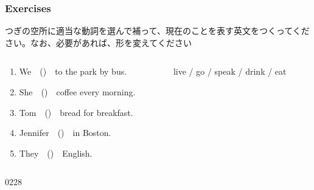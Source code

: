 \documentclass[aspectratio=169,xcolor={dvipsnames,table}]{beamer}
\newcommand{\myaudio}[1]{\href{#1}{\faVolumeUp}}
\begin{document}
\begin{frame}[plain,label=ex]\frametitle{Exercises}

{\small つぎの空所に適当な動詞を選んで補って、現在のことを表す英文をつくってください。なお、必要があれば、形を変えてください}

\bigskip

\begin{columns}
\begin{column}{.5\textwidth}
  \begin{enumerate}
   \item We~~()~~to the park by bus.
   \item  She~~()~~coffee every morning.
   \item Tom~~()~~bread for breakfast.
   \item Jennifer~~()~~in Boston.
   \item They~~()~~English.
  \end{enumerate}
\end{column}
\begin{column}{.45\textwidth}
\begin{tcolorbox}[title=この中から選んでください]
live / go / speak / drink / eat
\end{tcolorbox}
\end{column}
\end{columns}

\bigskip

\mbox{}\hfill{\tiny 0228}\,{\scriptsize \myaudio{audio/004_verb_03.mp3}}

\end{frame}
\end{document}
